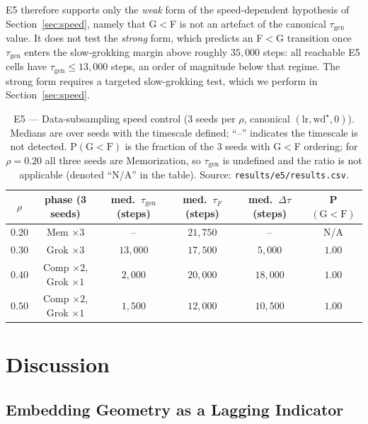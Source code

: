 \documentclass{article}
\newcommand{\taug}{\tau_{\mathrm{gen}}}
\newcommand{\tauf}{\tau_{F}}
\newcommand{\Dtau}{\Delta\tau}
\begin{document}
E5 therefore supports only the \emph{weak} form of the
speed-dependent hypothesis of Section~\ref{sec:speed}, namely
that G$<$F is not an artefact of the canonical $\taug$ value.
It does not test the \emph{strong} form, which predicts an
F$<$G transition once $\taug$ enters the slow-grokking margin
above roughly $35{,}000$ steps: all reachable E5 cells have
$\taug\leq 13{,}000$ steps, an order of magnitude below that
regime.
The strong form requires a targeted slow-grokking test, which we
perform in Section~\ref{sec:speed}.

\begin{table}[tbp]
  \centering
  \caption{E5 --- Data-subsampling speed control
    (3 seeds per $\rho$, canonical
    $(\mathrm{lr},\mathrm{wd}^{\star},0)$).
    Medians are over seeds with the timescale defined;
    ``--'' indicates the timescale is not detected.
    $\mathrm{P}(\mathrm{G}{<}\mathrm{F})$ is the fraction of the
    3 seeds with G$<$F ordering; for $\rho{=}0.20$ all three seeds
    are Memorization, so $\taug$ is undefined and the ratio is not
    applicable (denoted ``N/A'' in the table).
    Source: \texttt{results/e5/results.csv}.}
  \label{tab:e5_subsample}
  \small
  \begin{tabular}{cccccc}
    \toprule
    $\rho$ & phase (3 seeds) & med.\ $\taug$ (steps) & med.\ $\tauf$ (steps) &
    med.\ $\Dtau$ (steps) & P$(\mathrm{G}{<}\mathrm{F})$ \\
    \midrule
    $0.20$ & Mem $\times 3$                 & --         & $21{,}750$ & --          & N/A \\
    $0.30$ & Grok $\times 3$                & $13{,}000$ & $17{,}500$ & $5{,}000$   & $1.00$ \\
    $0.40$ & Comp $\times 2$, Grok $\times 1$ & $2{,}000$  & $20{,}000$ & $18{,}000$  & $1.00$ \\
    $0.50$ & Comp $\times 2$, Grok $\times 1$ & $1{,}500$  & $12{,}000$ & $10{,}500$  & $1.00$ \\
    \bottomrule
  \end{tabular}
\end{table}

\section{Discussion}
\label{sec:discussion}

\subsection{Embedding Geometry as a Lagging Indicator}
\end{document}
